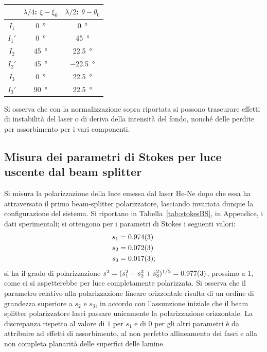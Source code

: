 \documentclass[10pt,oneside,a4paper]{article}
\begin{document}
\begin{multicols}{2}
\begin{center}
\label{tab:misuraStokes}
\begin{tabular}{c|c|c}
 &  $\lambda / 4$: $\xi-\xi_0$ & $\lambda / 2$: $\theta-\theta_0$  \\
\hline
     $I_1$  &        \SI{0}{\degree} &         \SI{0}{\degree} \\
     $I_1'$  &       \SI{0}{\degree} &         \SI{45}{\degree} \\
     \hline 
     $I_2$  &        \SI{45}{\degree} &         \SI{22.5}{\degree} \\
     $I_2'$  &       \SI{45}{\degree} &         \SI{-22.5}{\degree} \\
     \hline 
     $I_3$  &        \SI{0}{\degree} &         \SI{22.5}{\degree} \\
     $I_3'$	&		 \SI{90}{\degree} &         \SI{22.5}{\degree} \\
\hline
\end{tabular}
\end{center}

Si osserva che con la normalizzazione sopra riportata si possono trascurare effetti di instabilità del laser o di deriva della intensità del fondo, nonché delle perdite per assorbimento per i vari componenti.

\subsection{Misura dei parametri di Stokes per luce uscente dal beam splitter}
Si misura la polarizzazione della luce emessa dal laser He-Ne dopo che essa ha attraversato il primo beam-splitter polarizzatore, lasciando invariata dunque la configurazione del sistema. Si riportano in Tabella~\ref{tab:stokesBS}, in Appendice, i dati sperimentali; si ottengono per i parametri di Stokes i seguenti valori:
\[
\begin{aligned}
s_1 &= \SI{0.974 \pm 0.003}{} \\
s_2 &= \SI{0.072 \pm 0.003}{}\\
s_3 &= \SI{0.017 \pm 0.003}{};\\
\end{aligned}
\]
si ha il grado di polarizzazione $s^2 = (s_1^2+s_2^2+s_3^2)^{1/2} = \SI{0.977 \pm 0.003}{}$, prossimo a $1$, come ci si aspetterebbe per luce completamente polarizzata. Si osserva che il parametro relativo alla polarizzazione lineare orizzontale risulta di un ordine di grandezza superiore a $s_2$ e $s_3$, in accordo con l'assunzione iniziale che il beam splitter polarizzatore lasci passare unicamente la polarizzazione orizzontale. La discrepanza rispetto al valore di $1$ per $s_1$ e di $0$ per gli altri parametri è da attribuire ad effetti di assorbimento, al non perfetto allineamento dei fasci e alla non completa planarità delle superfici delle lamine.


\end{multicols}
\end{document}
